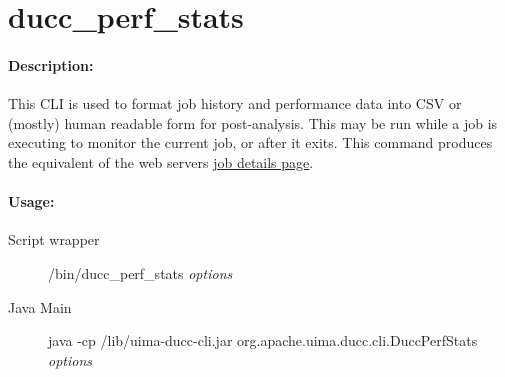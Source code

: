 % 
% 
% 
% 
\ifpdf
\else
{}
\fi
    \section{ducc\_perf\_stats}
    \label{sec:cli.ducc-perf-stats}
    \paragraph{Description:}
    This CLI is used to format job history and performance data into CSV or (mostly) human readable
    form for post-analysis.  This may be run while a job is executing to monitor the current job, or
    after it exits.  This command produces the equivalent of the web servers
    \hyperref[sec:ws-job-details]{job details page}.

    \paragraph{Usage:}
    \begin{description}
    \item[Script wrapper] \ducchome/bin/ducc\_perf\_stats {\em options}
    \item[Java Main]      java -cp \ducchome/lib/uima-ducc-cli.jar org.apache.uima.ducc.cli.DuccPerfStats {\em options}
    \end{description}

